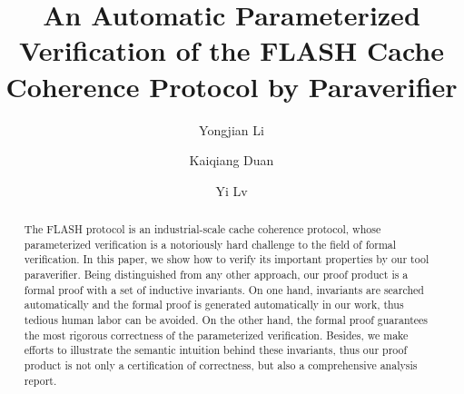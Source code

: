 \documentclass{llncs}
\newcommand{\bedt}[1]{{\color{black}#1}}
\begin{document}
\title{  An Automatic Parameterized Verification of the FLASH Cache Coherence Protocol by Paraverifier}
\author{Yongjian Li  \and
        Kaiqiang Duan  \and
        Yi Lv  }

\maketitle

\begin{abstract}
The FLASH protocol is an industrial-scale cache coherence protocol, whose parameterized verification is a notoriously hard challenge to the field of formal \bedt{verification}. In this paper, we show how to verify its important properties by our tool {\sf paraverifier}. Being distinguished from any other approach, our proof product is a formal  proof with a set of inductive invariants. %
\bedt{On one hand, invariants are searched automatically and the formal proof is generated automatically in our work, thus tedious human labor can be avoided. On the other hand, the formal proof guarantees the most rigorous correctness of the parameterized verification. Besides, we make efforts to illustrate the semantic intuition behind these invariants, thus our proof product is not only a certification of correctness, but also a comprehensive analysis report.}

\end{abstract}
\end{document}
